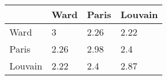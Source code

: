 \begin{tabular}{llll}
\toprule
{} &  Ward & Paris & Louvain \\
\midrule
Ward    &     3 &  2.26 &    2.22 \\
Paris   &  2.26 &  2.98 &     2.4 \\
Louvain &  2.22 &   2.4 &    2.87 \\
\bottomrule
\end{tabular}

